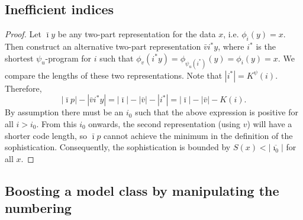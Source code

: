 \documentclass{style/llncs}
\newcommand{\s}{S}
\begin{document}
\subsection{Inefficient indices}
\label{section:appendix-inefficient-indices}

\ineffprefix*
\begin{proof}
Let $\bar\imath y$ be any two-part representation for the data $x$, i.e. $\phi_i(y)=x$. Then construct an alternative two-part representation $\bar vi^* y$, where $i^*$ is the shortest $\psi_u$-program for $i$ such that $\phi_v(i^* y)=\phi_{\psi_u(i^*)}(y) = \phi_i(y)=x$. We compare the lengths of these two representations. Note that $|i^*|=K^\psi(i)$. Therefore,
\[
|\bar\imath p|-|\bar v i^* y| = |\bar\imath|-|\bar v| - |i^*| = |\bar\imath|-|\bar v|-K(i).
\]
By assumption there must be an $i_0$ such that the above expression is positive for all $i>i_0$. From this $i_0$ onwards, the second representation (using $v$) will have a shorter code length, so $\bar\imath p$ cannot achieve the minimum in the definition of the sophistication. Consequently, the sophistication is bounded by $\s(x)<|\overline{\imath_0}|$ for all $x$. 
\end{proof}

\subsection{Boosting a model class by manipulating the numbering}

\coolone*
\end{document}

